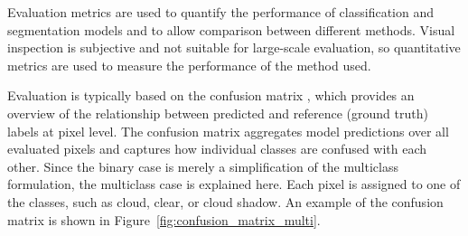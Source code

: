 Evaluation metrics are used to quantify the performance of classification and segmentation models and to allow comparison between different methods. Visual inspection is subjective and not suitable for large-scale evaluation, so quantitative metrics are used to measure the performance of the method used.

Evaluation is typically based on the confusion matrix \cite{powers2020}, which provides an overview of the relationship between predicted and reference (ground truth) labels at pixel level. The confusion matrix aggregates model predictions over all evaluated pixels and captures how individual classes are confused with each other. Since the binary case is merely a simplification of the multiclass formulation, the multiclass case is explained here. Each pixel is assigned to one of the classes, such as cloud, clear, or cloud shadow. An example of the confusion matrix is shown in Figure~\ref{fig:confusion_matrix_multi}.

